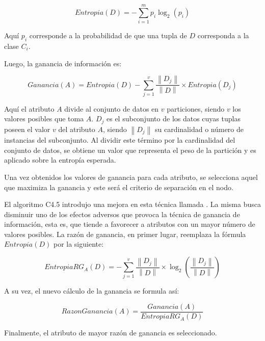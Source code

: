\begin{equation}
   Entropia(D) = - \sum_{i=1}^{m} p_{i}\log_{2}(p_{i})
\end{equation}

Aquí $p_{i}$ corresponde a la probabilidad de que una tupla de $D$ corresponda a
la clase $C_{i}$.  

Luego, la ganancia de información es:

\begin{equation}
   Ganancia(A) = Entropia(D) 
   - \sum_{j=1}^{v} \frac{\left\| D_{j} \right\|}{\left\| D \right\|} 
   \times Entropia(D_{j})
\end{equation}

Aquí el atributo $A$ divide al conjunto de datos en $v$ particiones, siendo $v$
los valores posibles que toma $A$. $D_{j}$ es el subconjunto de los datos cuyas
tuplas poseen el valor $v$ del atributo $A$, siendo $\left\|D_{j}\right\|$ su
cardinalidad o número de instancias del subconjunto. Al dividir este término por
la cardinalidad del conjunto de datos, se obtiene un valor que representa el
peso de la partición y es aplicado sobre la entropía esperada.

Una vez obtenidos los valores de ganancia para cada atributo, se selecciona
aquel que maximiza la ganancia y este será el criterio de separación en el nodo.

El algoritmo C4.5 introdujo una mejora en esta técnica llamada . La misma busca disminuir uno de los efectos adversos que provoca
la técnica de ganancia de información, esta es, que tiende a favorecer a
atributos con un mayor número de valores posibles. La razón de ganancia, en
primer lugar, reemplaza la fórmula $Entropia(D)$ por la siguiente:

\begin{equation}
   EntropiaRG_{A}(D) = - \sum_{j=1}^{v} \frac{\left\| D_{j} \right\|}{\left\| D \right\|} 
   \times \log_{2}(\frac{\left\| D_{j} \right\|}{\left\| D \right\|})
\end{equation}

A su vez, el nuevo cálculo de la ganancia se formula así:

\begin{equation} \label{eq:gan_c45}
   RazonGanancia(A) = \frac{Ganancia(A)}{EntropiaRG_{A}(D)} 
\end{equation}

Finalmente, el atributo de mayor razón de ganancia es seleccionado.


